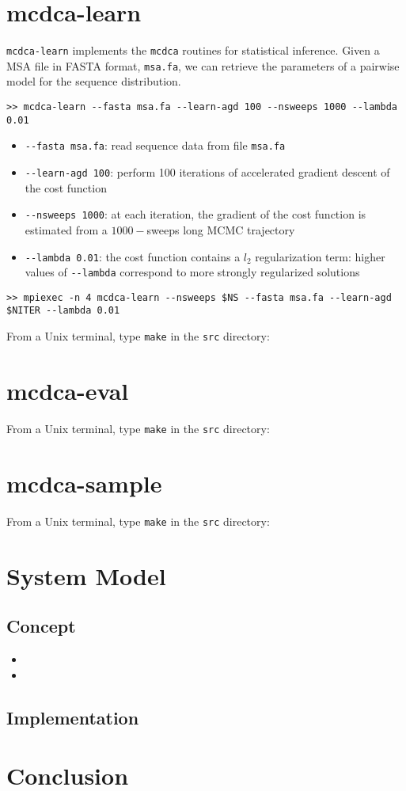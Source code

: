 \documentclass[a4paper,onecolumn]{article}
\begin{document}
\section{mcdca-learn}
\label{sec:mcdca-learn}
\verb|mcdca-learn| implements the \verb|mcdca| routines for statistical inference.
Given a MSA file in FASTA format, \verb|msa.fa|, we can retrieve the parameters of a pairwise model for the sequence distribution. 
\begin{verbatim}
>> mcdca-learn --fasta msa.fa --learn-agd 100 --nsweeps 1000 --lambda 0.01
\end{verbatim}
\begin{itemize}
\item \verb|--fasta msa.fa|: read sequence data from file \verb|msa.fa|
\item \verb|--learn-agd 100|: perform 100 iterations of accelerated gradient descent of the cost function
\item \verb|--nsweeps 1000|: at each iteration, the gradient of the cost function is estimated from a $1000-$sweeps long MCMC trajectory
\item \verb|--lambda 0.01|: the cost function contains a $l_2$ regularization term: higher values of \verb|--lambda| correspond to more strongly regularized solutions
\end{itemize}
\begin{verbatim}
>> mpiexec -n 4 mcdca-learn --nsweeps $NS --fasta msa.fa --learn-agd $NITER --lambda 0.01
\end{verbatim}
From a Unix terminal, type \verb|make| in the \verb|src| directory:

\section{mcdca-eval}
\label{sec:mcdca-eval}
From a Unix terminal, type \verb|make| in the \verb|src| directory:

\section{mcdca-sample}
\label{sec:mcdca-sample}
From a Unix terminal, type \verb|make| in the \verb|src| directory:

\section{System Model}
\label{sec:system-model}

\subsection{Concept}
\lipsum[1]\cite{asimov1951foundation}

\begin{itemize}
	\item \lipsum[53]
	\item \lipsum[11]
\end{itemize}

\lipsum[43]

\subsection{Implementation}
\lipsum[2]

\section{Conclusion}
\label{sec:conclusion}

\lipsum[9-10]


\end{document}
